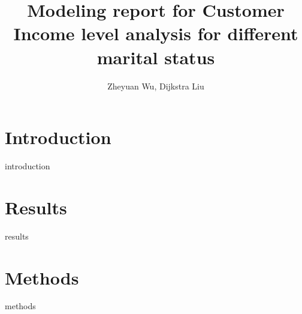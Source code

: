 \documentclass[11pt]{amsart}
\title{Modeling report for Customer Income level analysis for different marital status}
\author{Zheyuan Wu, Dijkstra Liu}
\begin{document}
\maketitle

\noindent\makebox[\linewidth]{\rule{\textwidth}{0.4pt}}

\section{Introduction}
{introduction}
\vspace*{10pt}

\section{Results}
{results}
\vspace*{10pt}

\section{Methods}
{methods}
\vspace*{10pt}
\end{document}
